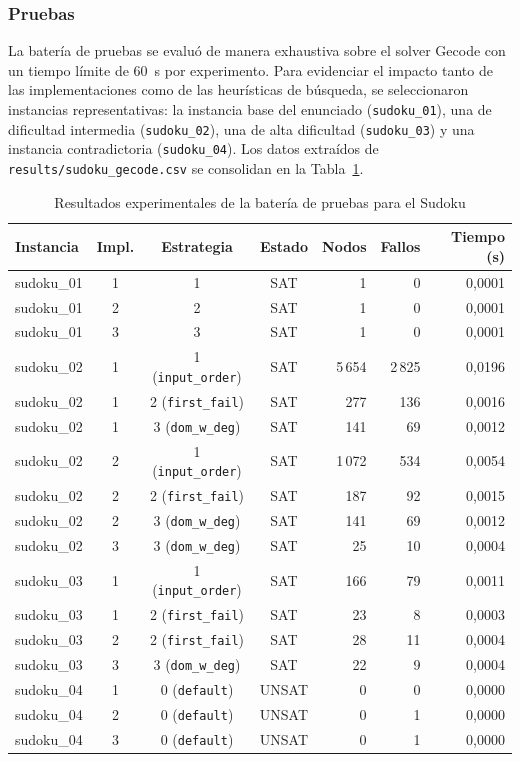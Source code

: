 \subsubsection{Pruebas}
La batería de pruebas se evaluó de manera exhaustiva sobre el solver Gecode con un tiempo límite de $60$~s por experimento. Para evidenciar el impacto tanto de las implementaciones como de las heurísticas de búsqueda, se seleccionaron instancias representativas: la instancia base del enunciado (\texttt{sudoku\_01}), una de dificultad intermedia (\texttt{sudoku\_02}), una de alta dificultad (\texttt{sudoku\_03}) y una instancia contradictoria (\texttt{sudoku\_04}). Los datos extraídos de \texttt{results/sudoku\_gecode.csv} se consolidan en la Tabla~\ref{tab:sudoku-resultados}.

\begin{table}[htbp]
\small
\caption{Resultados experimentales de la batería de pruebas para el Sudoku}
\label{tab:sudoku-resultados}
\begin{tabular}{lcccrrr}
\toprule
\textbf{Instancia} & \textbf{Impl.} & \textbf{Estrategia} & \textbf{Estado} & \textbf{Nodos} & \textbf{Fallos} & \textbf{Tiempo (s)} \\
\midrule
sudoku\_01 & 1 & 1 & SAT & 1 & 0 & 0,0001 \\
sudoku\_01 & 2 & 2 & SAT & 1 & 0 & 0,0001 \\
sudoku\_01 & 3 & 3 & SAT & 1 & 0 & 0,0001 \\
\midrule
sudoku\_02 & 1 & 1 (\texttt{input\_order}) & SAT & 5\,654 & 2\,825 & 0,0196 \\
sudoku\_02 & 1 & 2 (\texttt{first\_fail})  & SAT & 277 & 136 & 0,0016 \\
sudoku\_02 & 1 & 3 (\texttt{dom\_w\_deg})   & SAT & 141 & 69 & 0,0012 \\
sudoku\_02 & 2 & 1 (\texttt{input\_order}) & SAT & 1\,072 & 534 & 0,0054 \\
sudoku\_02 & 2 & 2 (\texttt{first\_fail})  & SAT & 187 & 92 & 0,0015 \\
sudoku\_02 & 2 & 3 (\texttt{dom\_w\_deg})   & SAT & 141 & 69 & 0,0012 \\
sudoku\_02 & 3 & 3 (\texttt{dom\_w\_deg})   & SAT & 25 & 10 & 0,0004 \\
\midrule
sudoku\_03 & 1 & 1 (\texttt{input\_order}) & SAT & 166 & 79 & 0,0011 \\
sudoku\_03 & 1 & 2 (\texttt{first\_fail})  & SAT & 23 & 8 & 0,0003 \\
sudoku\_03 & 2 & 2 (\texttt{first\_fail})  & SAT & 28 & 11 & 0,0004 \\
sudoku\_03 & 3 & 3 (\texttt{dom\_w\_deg})   & SAT & 22 & 9 & 0,0004 \\
\midrule
sudoku\_04 & 1 & 0 (\texttt{default})      & UNSAT & 0 & 0 & 0,0000 \\
sudoku\_04 & 2 & 0 (\texttt{default})      & UNSAT & 0 & 1 & 0,0000 \\
sudoku\_04 & 3 & 0 (\texttt{default})      & UNSAT & 0 & 1 & 0,0000 \\
\bottomrule
\end{tabular}
\end{table}

